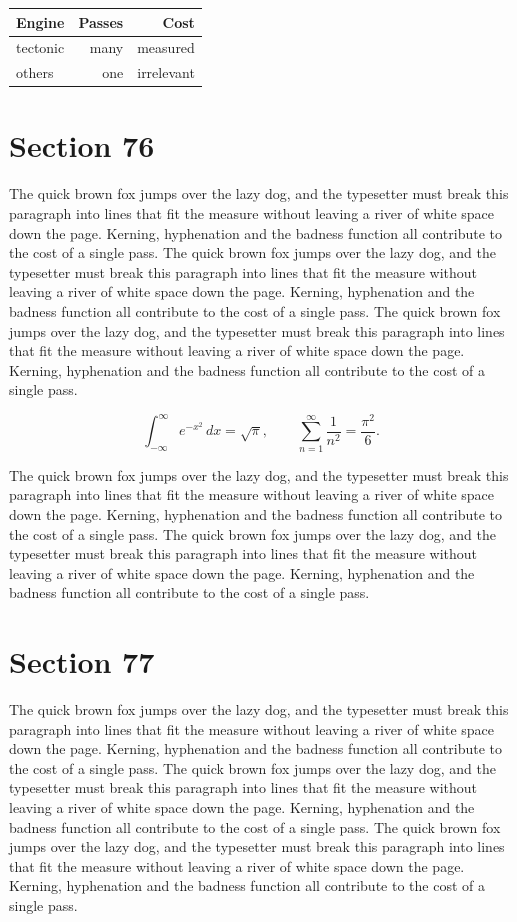 \documentclass{article}
\begin{document}
\begin{center}
\begin{tabular}{lrr}
\toprule
Engine & Passes & Cost \\
\midrule
tectonic & many & measured \\
others & one & irrelevant \\
\bottomrule
\end{tabular}
\end{center}

\section{Section 76}
The quick brown fox jumps over the lazy dog, and the typesetter must break this paragraph into lines that fit the measure without leaving a river of white space down the page. Kerning, hyphenation and the badness function all contribute to the cost of a single pass. The quick brown fox jumps over the lazy dog, and the typesetter must break this paragraph into lines that fit the measure without leaving a river of white space down the page. Kerning, hyphenation and the badness function all contribute to the cost of a single pass. The quick brown fox jumps over the lazy dog, and the typesetter must break this paragraph into lines that fit the measure without leaving a river of white space down the page. Kerning, hyphenation and the badness function all contribute to the cost of a single pass. 

\begin{equation}
\int_{-\infty}^{\infty} e^{-x^{2}}\,dx = \sqrt{\pi}, \qquad
\sum_{n=1}^{\infty} \frac{1}{n^{2}} = \frac{\pi^{2}}{6}.
\end{equation}

The quick brown fox jumps over the lazy dog, and the typesetter must break this paragraph into lines that fit the measure without leaving a river of white space down the page. Kerning, hyphenation and the badness function all contribute to the cost of a single pass. The quick brown fox jumps over the lazy dog, and the typesetter must break this paragraph into lines that fit the measure without leaving a river of white space down the page. Kerning, hyphenation and the badness function all contribute to the cost of a single pass. 
\section{Section 77}
The quick brown fox jumps over the lazy dog, and the typesetter must break this paragraph into lines that fit the measure without leaving a river of white space down the page. Kerning, hyphenation and the badness function all contribute to the cost of a single pass. The quick brown fox jumps over the lazy dog, and the typesetter must break this paragraph into lines that fit the measure without leaving a river of white space down the page. Kerning, hyphenation and the badness function all contribute to the cost of a single pass. The quick brown fox jumps over the lazy dog, and the typesetter must break this paragraph into lines that fit the measure without leaving a river of white space down the page. Kerning, hyphenation and the badness function all contribute to the cost of a single pass. 
\end{document}
